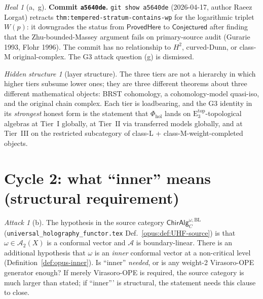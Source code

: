 \documentclass{article}
\theoremstyle{definition}
\theoremstyle{remark}
\newtheorem{attack}[theorem]{Attack}
\newtheorem{heal}[theorem]{Heal}
\newtheorem{hidden}[theorem]{Hidden structure}
\newcommand{\Phihol}{\Phi_{\mathrm{hol}}}
\newcommand{\ChirAlg}{\mathsf{ChirAlg}}
\newcommand{\Etop}[1]{\mathrm{E}_{#1}^{\mathrm{top}}}
\newcommand{\cA}{\mathcal{A}}
\begin{document}
\begin{heal}[a,~g]
\smallskip
\textbf{Commit \texttt{a5640de}.} \texttt{git show a5640de}
(2026-04-17, author Raeez Lorgat) retracts
\texttt{thm:tempered-stratum-contains-wp} for the logarithmic
triplet $W(p)$: it downgrades the status from
$\textsf{ProvedHere}$ to $\textsf{Conjectured}$ after finding
that the Zhu-bounded-Massey argument fails on primary-source
audit (Gurarie 1993, Flohr 1996). The commit has no
relationship to $H^2$, curved-Dunn, or class-M
original-complex. The G3 attack question (g) is dismissed.
\end{heal}

\begin{hidden}[layer structure]
\label{hidden:cycle1}
The three tiers are not a hierarchy in which higher tiers
subsume lower ones; they are three different theorems about
three different mathematical objects: BRST cohomology, a
cohomology-model quasi-iso, and the original chain complex.
Each tier is loadbearing, and the G3 identity in its
\emph{strongest} honest form is the statement that
$\Phihol$ lands on $\Etop{3}$-topological algebras at
Tier~I globally, at Tier~II via transferred models
globally, and at Tier~III on the restricted subcategory of
class-L + class-M-weight-completed objects.
\end{hidden}

\section{Cycle 2: what ``inner'' means (structural requirement)}
\label{sec:opus-cycle-2}

\begin{attack}[b]
\label{att:cycle2}
The hypothesis in the source category
$\ChirAlg^{\omega,\mathrm{BL}}_C$
(\texttt{universal\_holography\_functor.tex}
Def.~\ref*{opus:def:UHF-source}) is that $\omega \in \cA_2(X)$
is a conformal vector and $\cA$ is boundary-linear. There is
an additional hypothesis that $\omega$ is an
\emph{inner} conformal vector at a non-critical level
(Definition~\ref{def:opus-inner}). Is ``inner''
\emph{needed}, or is any weight-2 Virasoro-OPE generator
enough? If merely Virasoro-OPE is required, the source
category is much larger than stated; if ``inner''' is
structural, the statement needs this clause to close.
\end{attack}
\end{document}
